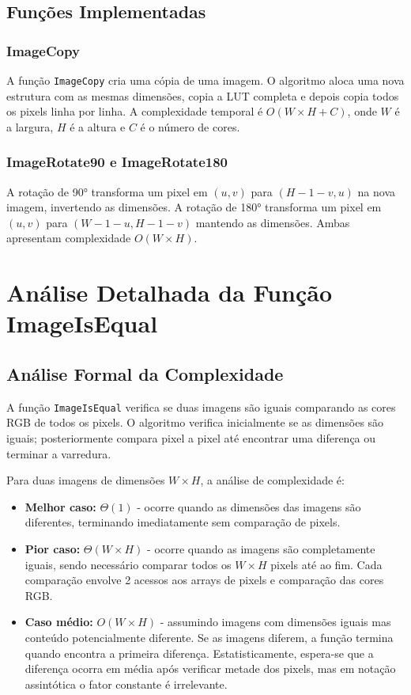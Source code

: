 \documentclass[12pt,a4paper]{article}
\begin{document}
\subsection{Funções Implementadas}

\subsubsection{ImageCopy}

A função \texttt{ImageCopy} cria uma cópia de uma imagem. O algoritmo aloca uma nova estrutura com as mesmas dimensões, copia a LUT completa e depois copia todos os pixels linha por linha. A complexidade temporal é $O(W \times H + C)$, onde $W$ é a largura, $H$ é a altura e $C$ é o número de cores.

\subsubsection{ImageRotate90 e ImageRotate180}

A rotação de 90° transforma um pixel em $(u, v)$ para $(H-1-v, u)$ na nova imagem, invertendo as dimensões. A rotação de 180° transforma um pixel em $(u, v)$ para $(W-1-u, H-1-v)$ mantendo as dimensões. Ambas apresentam complexidade $O(W \times H)$.

\section{Análise Detalhada da Função ImageIsEqual}

\subsection{Análise Formal da Complexidade}

A função \texttt{ImageIsEqual} verifica se duas imagens são iguais comparando as cores RGB de todos os pixels. O algoritmo verifica inicialmente se as dimensões são iguais; posteriormente compara pixel a pixel até encontrar uma diferença ou terminar a varredura.

Para duas imagens de dimensões $W \times H$, a análise de complexidade é:

\begin{itemize}
\item \textbf{Melhor caso:} $\Theta(1)$ - ocorre quando as dimensões das imagens são diferentes, terminando imediatamente sem comparação de pixels.

\item \textbf{Pior caso:} $\Theta(W \times H)$ - ocorre quando as imagens são completamente iguais, sendo necessário comparar todos os $W \times H$ pixels até ao fim. Cada comparação envolve 2 acessos aos arrays de pixels e comparação das cores RGB.

\item \textbf{Caso médio:} $O(W \times H)$ - assumindo imagens com dimensões iguais mas conteúdo potencialmente diferente. Se as imagens diferem, a função termina quando encontra a primeira diferença. Estatisticamente, espera-se que a diferença ocorra em média após verificar metade dos pixels, mas em notação assintótica o fator constante é irrelevante.
\end{itemize}
\end{document}
